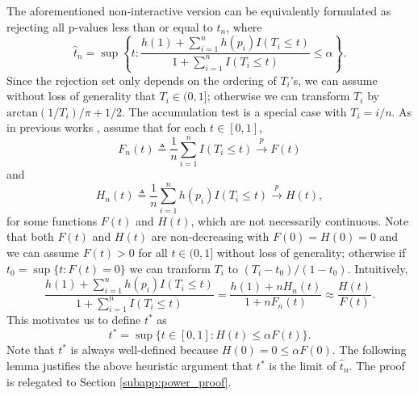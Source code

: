 \documentclass{biometrika}
\newcommand{\1}{\mathbf{1}}
\begin{document}
The aforementioned non-interactive version can be equivalently formulated as rejecting all p-values less than or equal to $\hat{t}_{n}$, where
\begin{equation}
  \label{eq:hatt}
  \hat{t}_{n} = \sup\left\{t: \frac{h(1) + \sum_{i=1}^{n}h(p_{i})I(T_{i}\le t)}{1 + \sum_{i=1}^{n}I(T_{i}\le t)}\le \alpha\right\}.
\end{equation}
Since the rejection set only depends on the ordering of $T_{i}$'s, we can assume without loss of generality that $T_{i}\in
 (0, 1]$; otherwise we can transform $T_{i}$ by $\mathrm{arctan}(1 / T_{i})/\pi + 1 / 2$. The accumulation test is a special case with $T_{i} = i / n$. As in previous works \citep{li2016accumulation, lei2016power}, assume that for each $t\in [0, 1]$,
\begin{equation}
  \label{eq:Fn}
  F_{n}(t)\triangleq \frac{1}{n}\sum_{i=1}^{n}I(T_{i} \le t)\stackrel{p}{\rightarrow} F(t)
\end{equation}
and 
\begin{equation}
  \label{eq:Fn}
  H_{n}(t)\triangleq \frac{1}{n}\sum_{i=1}^{n}h(p_{i})I(T_{i} \le t)\stackrel{p}{\rightarrow} H(t),
\end{equation}
for some functions $F(t)$ and $H(t)$, which are not necessarily continuous. Note that both $F(t)$ and $H(t)$ are non-decreasing with $F(0) = H(0) = 0$ and we can assume $F(t) > 0$ for all $t\in (0, 1]$ without loss of generality; otherwise if $t_{0} = \sup\{t: F(t) = 0\}$ we can tranform $T_{i}$ to $(T_{i} - t_{0}) / (1 - t_{0})$. Intuitively, 
\[\frac{h(1) + \sum_{i=1}^{n}h(p_{i})I(T_{i}\le t)}{1 + \sum_{i=1}^{n}I(T_{i}\le t)} = \frac{h(1) + nH_{n}(t)}{1 + nF_{n}(t)}\approx \frac{H(t)}{F(t)}.\]
This motivates us to define $t^{*}$ as
\begin{equation}
  \label{eq:tstar}
  t^{*} = \sup\{t\in [0, 1]: H(t)\le \alpha F(t)\}.
\end{equation}
Note that $t^{*}$ is always well-defined because $H(0) = 0 \le \alpha F(0)$. The following lemma justifies the above heuristic argument that $t^{*}$ is the limit of $\hat{t}_{n}$. The proof is relegated to Section \ref{subapp:power_proof}.
\end{document}
